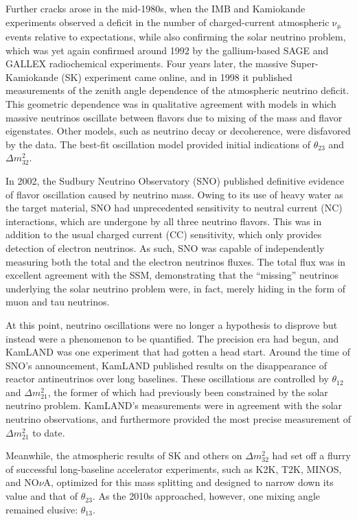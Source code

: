 \documentclass[../thesis.tex]{subfiles}
\begin{document}
Further cracks arose in the mid-1980s, when the IMB and Kamiokande experiments observed a deficit in the number of charged-current atmospheric $\mathrm{\nu_\mu}$ events relative to expectations, while also confirming the solar neutrino problem, which was yet again confirmed around 1992 by the gallium-based SAGE and GALLEX radiochemical experiments. Four years later, the massive Super-Kamiokande (SK) experiment came online, and in 1998 it published measurements of the zenith angle dependence of the atmospheric neutrino deficit. This geometric dependence was in qualitative agreement with models in which massive neutrinos oscillate between flavors due to mixing of the mass and flavor eigenstates. Other models, such as neutrino decay or decoherence, were disfavored by the data. The best-fit oscillation model provided initial indications of $\theta_{23}$ and $\Delta m^2_{32}$. 

In 2002, the Sudbury Neutrino Observatory (SNO) published definitive evidence of flavor oscillation caused by neutrino mass. Owing to its use of heavy water as the target material, SNO had unprecedented sensitivity to neutral current (NC) interactions, which are undergone by all three neutrino flavors. This was in addition to the usual charged current (CC) sensitivity, which only provides detection of electron neutrinos. As such, SNO was capable of independently measuring both the total and the electron neutrinos fluxes. The total flux was in excellent agreement with the SSM, demonstrating that the ``missing'' neutrinos underlying the solar neutrino problem were, in fact, merely hiding in the form of muon and tau neutrinos.

At this point, neutrino oscillations were no longer a hypothesis to disprove but instead were a phenomenon to be quantified. The precision era had begun, and KamLAND was one experiment that had gotten a head start. Around the time of SNO's announcement, KamLAND published results on the disappearance of reactor antineutrinos over long baselines. These oscillations are controlled by $\theta_{12}$ and $\Delta m^2_{21}$, the former of which had previously been constrained by the solar neutrino problem. KamLAND's measurements were in agreement with the solar neutrino observations, and furthermore provided the most precise measurement of $\Delta m^2_{21}$ to date.

Meanwhile, the atmospheric results of SK and others on $\Delta m^2_{32}$ had set off a flurry of successful long-baseline accelerator experiments, such as K2K, T2K, MINOS, and NO$\nu$A, optimized for this mass splitting and designed to narrow down its value and that of $\theta_{23}$. As the 2010s approached, however, one mixing angle remained elusive: $\theta_{13}$.
\end{document}
